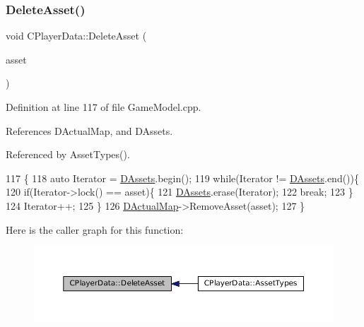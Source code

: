 \subsubsection{\texorpdfstring{Delete\+Asset()}{DeleteAsset()}}
{\footnotesize\ttfamily void C\+Player\+Data\+::\+Delete\+Asset (\begin{DoxyParamCaption}\item[{std\+::shared\+\_\+ptr$<$ \hyperlink{classCPlayerAsset}{C\+Player\+Asset} $>$}]{asset }\end{DoxyParamCaption})}



Definition at line 117 of file Game\+Model.\+cpp.



References D\+Actual\+Map, and D\+Assets.



Referenced by Asset\+Types().


\begin{DoxyCode}
117                                                                 \{
118     \textcolor{keyword}{auto} Iterator = \hyperlink{classCPlayerData_a1d7dd355facf52db6242e3554373906c}{DAssets}.begin();
119     \textcolor{keywordflow}{while}(Iterator != \hyperlink{classCPlayerData_a1d7dd355facf52db6242e3554373906c}{DAssets}.end())\{
120         \textcolor{keywordflow}{if}(Iterator->lock() == asset)\{
121             \hyperlink{classCPlayerData_a1d7dd355facf52db6242e3554373906c}{DAssets}.erase(Iterator);
122             \textcolor{keywordflow}{break};
123         \}
124         Iterator++;
125     \}
126     \hyperlink{classCPlayerData_a943801106af1d7ad52abd73d32552186}{DActualMap}->RemoveAsset(asset);
127 \}
\end{DoxyCode}
Here is the caller graph for this function\+:\nopagebreak
\begin{figure}[H]
\begin{center}
\leavevmode
\includegraphics[width=350pt]{classCPlayerData_a24f56e033f6d68ceba0f876d854201f0_icgraph}
\end{center}
\end{figure}
\hypertarget{classCPlayerData_ac43ee660aa07b2d9d96eb5285d50fab5}{}\label{classCPlayerData_ac43ee660aa07b2d9d96eb5285d50fab5} 
